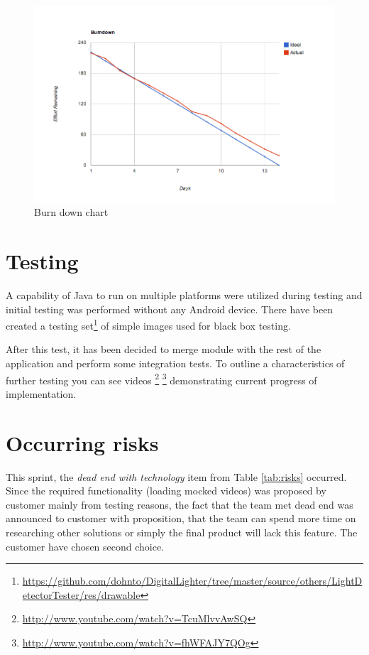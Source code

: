 \begin{figure}[h]
	\centering
		\includegraphics[width=18cm]{sprint3/BurndownSprint3.png}
	\caption{Burn down chart}
	\label{fig:Burn3 }
\end{figure}

\section{Testing}
A capability of Java to run on multiple platforms were utilized during testing and initial testing was performed without any Android device.
There have been created a testing set\footnote{\url{https://github.com/dohnto/DigitalLighter/tree/master/source/others/LightDetectorTester/res/drawable}} of simple images used for black box testing.

After this test, it has been decided to merge module with the rest of the application and perform some integration tests.
To outline a characteristics of further testing you can see videos \footnote{\url{http://www.youtube.com/watch?v=TcuMlvvAwSQ}} \footnote{\url{http://www.youtube.com/watch?v=fhWFAJY7QOg}} demonstrating current progress of implementation.

\section{Occurring risks}
This sprint, the \emph{dead end with technology} item from Table \ref{tab:risks} occurred. 
Since the required functionality (loading mocked videos) was proposed by customer mainly from testing reasons, the fact that the team met dead end was announced to customer with proposition, that the team can spend more time on researching other solutions or simply the final product will lack this feature.
The customer have chosen second choice.

